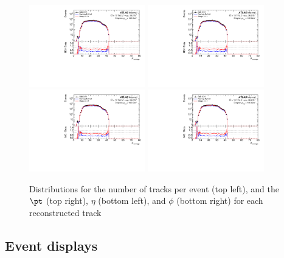 \begin{figure}[h!]
  \centering
  \includegraphics[page=128,width=0.45\textwidth]{figures/ZjetOmnifoldMCDataComp.pdf}
  \includegraphics[page=144,width=0.45\textwidth]{figures/ZjetOmnifoldMCDataComp.pdf} \\
  \includegraphics[page=148,width=0.45\textwidth]{figures/ZjetOmnifoldMCDataComp.pdf}
  \includegraphics[page=152,width=0.45\textwidth]{figures/ZjetOmnifoldMCDataComp.pdf}
  \caption{Distributions for the number of tracks per event (top left), and the $\pt$ (top right), $\eta$ (bottom left), and $\phi$ (bottom right) for each reconstructed track}
  \label{fig:trackInfo}
\end{figure}

\subsection{Event displays}
\label{sec:event-displays}

